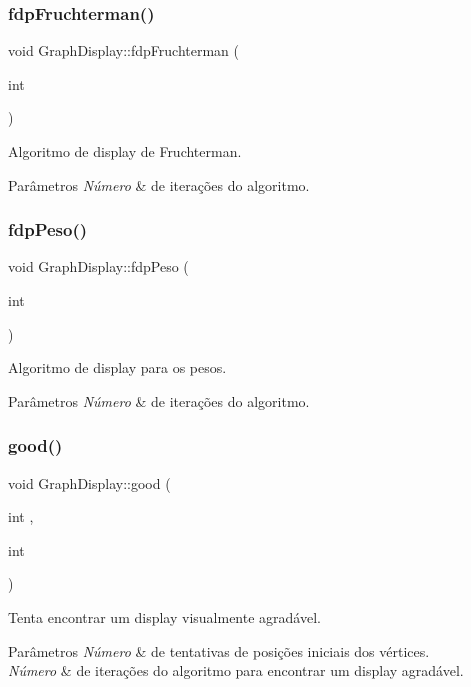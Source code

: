 \subsubsection{\texorpdfstring{fdpFruchterman()}{fdpFruchterman()}}
{\footnotesize\ttfamily void Graph\+Display\+::fdp\+Fruchterman (\begin{DoxyParamCaption}\item[{int}]{ }\end{DoxyParamCaption})}

Algoritmo de display de Fruchterman. 
\begin{DoxyParams}{Parâmetros}
{\em Número} & de iterações do algoritmo. \\
\hline
\end{DoxyParams}
\mbox{\label{classGraphDisplay_a9d55e916fea8b749eaee51def8d004d3}} 
\subsubsection{\texorpdfstring{fdpPeso()}{fdpPeso()}}
{\footnotesize\ttfamily void Graph\+Display\+::fdp\+Peso (\begin{DoxyParamCaption}\item[{int}]{ }\end{DoxyParamCaption})}

Algoritmo de display para os pesos. 
\begin{DoxyParams}{Parâmetros}
{\em Número} & de iterações do algoritmo. \\
\hline
\end{DoxyParams}
\mbox{\label{classGraphDisplay_a27d6e383e51648eff72a3ac43abc5c0c}} 
\subsubsection{\texorpdfstring{good()}{good()}}
{\footnotesize\ttfamily void Graph\+Display\+::good (\begin{DoxyParamCaption}\item[{int}]{,  }\item[{int}]{ }\end{DoxyParamCaption})}

Tenta encontrar um display visualmente agradável. 
\begin{DoxyParams}{Parâmetros}
{\em Número} & de tentativas de posições iniciais dos vértices. \\
\hline
{\em Número} & de iterações do algoritmo para encontrar um display agradável. \\
\hline
\end{DoxyParams}
\mbox{\label{classGraphDisplay_aa9300be5d20b62596cf709223a3dd67d}} 
